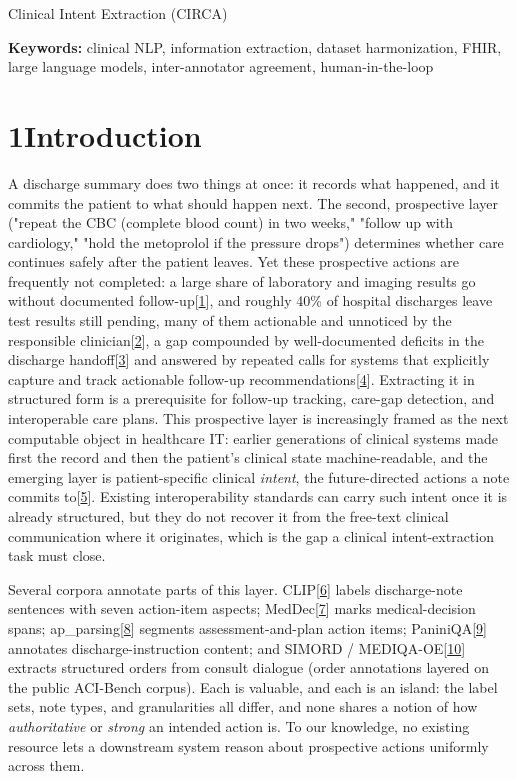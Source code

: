 Clinical Intent Extraction (CIRCA)

\textbf{Keywords:} clinical NLP, information extraction, dataset harmonization, FHIR, large language models, inter-annotator agreement, human-in-the-loop

\section{\texorpdfstring{{1}Introduction}{1Introduction}}\label{introduction}

A discharge summary does two things at once: it records what happened, and it commits the patient to what should happen next. The second, prospective layer ("repeat the CBC (complete blood count) in two weeks," "follow up with cardiology," "hold the metoprolol if the pressure drops") determines whether care continues safely after the patient leaves. Yet these prospective actions are frequently not completed: a large share of laboratory and imaging results go without documented follow-up{[}\hyperref[r1]{1}{]}, and roughly 40\% of hospital discharges leave test results still pending, many of them actionable and unnoticed by the responsible clinician{[}\hyperref[r2]{2}{]}, a gap compounded by well-documented deficits in the discharge handoff{[}\hyperref[r3]{3}{]} and answered by repeated calls for systems that explicitly capture and track actionable follow-up recommendations{[}\hyperref[r4]{4}{]}. Extracting it in structured form is a prerequisite for follow-up tracking, care-gap detection, and interoperable care plans. This prospective layer is increasingly framed as the next computable object in healthcare IT: earlier generations of clinical systems made first the record and then the patient's clinical state machine-readable, and the emerging layer is patient-specific clinical \emph{intent}, the future-directed actions a note commits to{[}\hyperref[r5]{5}{]}. Existing interoperability standards can carry such intent once it is already structured, but they do not recover it from the free-text clinical communication where it originates, which is the gap a clinical intent-extraction task must close.

Several corpora annotate parts of this layer. CLIP{[}\hyperref[r6]{6}{]} labels discharge-note sentences with seven action-item aspects; MedDec{[}\hyperref[r7]{7}{]} marks medical-decision spans; ap\_parsing{[}\hyperref[r8]{8}{]} segments assessment-and-plan action items; PaniniQA{[}\hyperref[r9]{9}{]} annotates discharge-instruction content; and SIMORD / MEDIQA-OE{[}\hyperref[r10]{10}{]} extracts structured orders from consult dialogue (order annotations layered on the public ACI-Bench corpus). Each is valuable, and each is an island: the label sets, note types, and granularities all differ, and none shares a notion of how \emph{authoritative} or \emph{strong} an intended action is. To our knowledge, no existing resource lets a downstream system reason about prospective actions uniformly across them.

